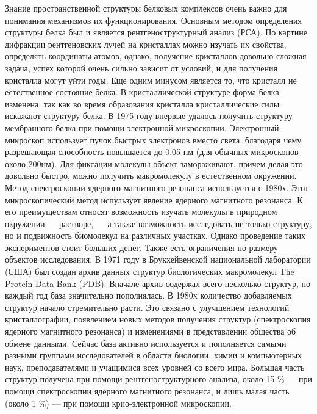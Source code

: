 \documentclass[a4paper,12pt]{article}
\numberwithin{equation}{section}%
\begin{document}
Знание пространственной структуры белковых комплексов очень важно для понимания механизмов их функционирования.
\newline
Основным методом определения структуры белка был и является рентгеноструктурный анализ (РСА)\cite{s1}\cite{s2}. По картине дифракции рентгеновских лучей на кристаллах можно изучать их свойства, определять координаты атомов, однако, получение кристаллов довольно сложная задача, успех которой очень сильно зависит от условий, и для получения кристалла могут уйти годы. Еще одним минусом является то, что кристалл не естественное состояние белка. В кристаллической структуре форма белка изменена, так как во время образования кристалла кристаллические силы искажают структуру белка.
\newline
В 1975 году впервые удалось получить структуру мембранного белка при помощи электронной микроскопии\cite{s3}. Электронный микроскоп использует пучок быстрых электронов вместо света, благодаря чему разрешающая способность повышается до 0.05 нм (для обычных микроскопов около 200нм). Для фиксации молекулы объект замораживают\cite{s4}, причем делая это довольно быстро, можно получить макромолекулу в естественном окружении.
\newline
Метод спектроскопии ядерного магнитного резонанса\cite{s5} используется с 1980х. Этот микроскопический метод испульзует явление ядерного магнитного резонанса. К его преимуществам относят возможность изучать молекулы в природном окружении — растворе, — а также возможность исследовать не только структуру, но и подвижность биомолекул на различных участках. Однако проведение таких экспериментов стоит больших денег. Также есть ограничения по размеру объектов исследования.
\newline
В 1971 году в Брукхейвенской национальной лаборатории (США) был создан архив данных структур биологических макромолекул The Protein Data Bank (PDB)\cite{s6}. Вначале архив содержал всего несколько структур, но каждый год база значительно пополнялась. В 1980х количество добавляемых структур начало стремительно расти. Это связано с улучшением технологий кристаллографии, появлением новых методов получения структур (спектроскопия ядерного магнитного резонанса) и изменениями в представлении общества об обмене данными. Сейчас база активно используется и пополняется самыми разными группами исследователей в области биологии, химии и компьютерных наук, преподавателями и учащимися всех уровней со всего мира.
\newline
Большая часть структур получена при помощи рентгеноструктурного анализа, около 15 \% — при помощи спектроскопии ядерного магнитного резонанса, и лишь малая часть (около 1 \%) — при помощи крио-электронной микроскопии. 
\end{document}
